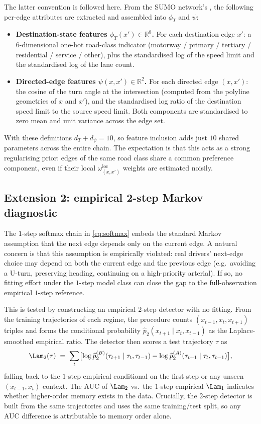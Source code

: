The latter convention is followed here. From the SUMO network's
, the following per-edge attributes are extracted and
assembled into $\phi_T$ and $\psi$:
\begin{itemize}
\item \textbf{Destination-state features $\phi_T(x') \in \mathbb{R}^{8}$.}
For each destination edge $x'$: a $6$-dimensional one-hot road-class
indicator (motorway / primary / tertiary / residential / service / other),
plus the standardised log of the speed limit and the standardised log of
the lane count.
\item \textbf{Directed-edge features $\psi(x, x') \in \mathbb{R}^{2}$.}
For each directed edge $(x, x')$: the cosine of the turn angle at the
intersection (computed from the polyline geometries of $x$ and $x'$),
and the standardised log ratio of the destination speed limit to the
source speed limit. Both components are standardised to zero mean and
unit variance across the edge set.
\end{itemize}
With these definitions $d_T + d_\psi = 10$, so feature inclusion adds
just $10$ shared parameters across the entire chain. The
expectation is that this acts as a strong regularising prior: edges of
the same road class share a common preference component, even if their
local $\omega^{\mathrm{loc}}_{(x, x')}$ weights are estimated noisily.

\subsection{Extension 2: empirical 2-step Markov diagnostic}
\label{sec:2step-diag}

The $1$-step softmax chain in \eqref{eq:softmax} embeds the standard
Markov assumption that the next edge depends only on the current edge.
A natural concern is that this assumption is empirically violated:
real drivers' next-edge choice may depend on both the current
edge and the previous edge (e.g.\ avoiding a U-turn, preserving heading,
continuing on a high-priority arterial). If so, no fitting effort under
the $1$-step model class can close the gap to the full-observation
empirical $1$-step reference.

This is tested by constructing an empirical $2$-step detector with no
fitting. From the training trajectories of each regime, the procedure counts
$(x_{t-1}, x_t, x_{t+1})$ triples and forms the conditional probability
$\widehat{p}_{2}(x_{t+1} \mid x_t, x_{t-1})$ as the Laplace-smoothed
empirical ratio. The detector then scores a test trajectory $\tau$ as
\[
\Lam_{2}(\tau) \;=\; \sum_{t}\bigl[\log\widehat{p}_{2}^{(B)}(\tau_{t+1}\mid\tau_t,\tau_{t-1}) - \log\widehat{p}_{2}^{(A)}(\tau_{t+1}\mid\tau_t,\tau_{t-1})\bigr],
\]
falling back to the $1$-step empirical conditional on the first step or
any unseen $(x_{t-1}, x_t)$ context. The AUC of $\Lam_{2}$ vs.\ the
$1$-step empirical $\Lam_{1}$ indicates whether higher-order memory
exists in the data. Crucially, the $2$-step detector is built from the
same trajectories and uses the same training/test split, so any
AUC difference is attributable to memory order alone.

